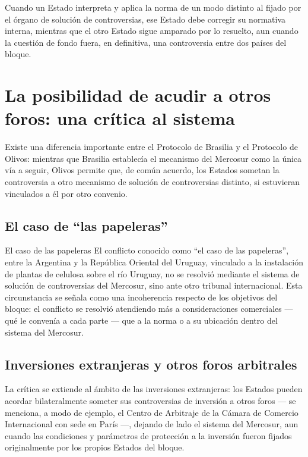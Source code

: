 \documentclass[12pt,oneside]{book}
\begin{document}
Cuando un Estado interpreta y aplica la norma de un modo distinto al fijado por el órgano de solución de controversias, ese Estado debe corregir su normativa interna, mientras que el otro Estado sigue amparado por lo resuelto, aun cuando la cuestión de fondo fuera, en definitiva, una controversia entre dos países del bloque.

\section{La posibilidad de acudir a otros foros: una crítica al sistema}

Existe una diferencia importante entre el Protocolo de Brasilia y el Protocolo de Olivos: mientras que Brasilia establecía el mecanismo del Mercosur como la única vía a seguir, Olivos permite que, de común acuerdo, los Estados sometan la controversia a otro mecanismo de solución de controversias distinto, si estuvieran vinculados a él por otro convenio.

\subsection{El caso de ``las papeleras''}

\begin{example}{El caso de las papeleras}
El conflicto conocido como ``el caso de las papeleras'', entre la Argentina y la República Oriental del Uruguay, vinculado a la instalación de plantas de celulosa sobre el río Uruguay, no se resolvió mediante el sistema de solución de controversias del Mercosur, sino ante otro tribunal internacional. Esta circunstancia se señala como una incoherencia respecto de los objetivos del bloque: el conflicto se resolvió atendiendo más a consideraciones comerciales --- qué le convenía a cada parte --- que a la norma o a su ubicación dentro del sistema del Mercosur.
\end{example}

\subsection{Inversiones extranjeras y otros foros arbitrales}

La crítica se extiende al ámbito de las inversiones extranjeras: los Estados pueden acordar bilateralmente someter sus controversias de inversión a otros foros --- se menciona, a modo de ejemplo, el Centro de Arbitraje de la Cámara de Comercio Internacional con sede en París ---, dejando de lado el sistema del Mercosur, aun cuando las condiciones y parámetros de protección a la inversión fueron fijados originalmente por los propios Estados del bloque.
\end{document}
